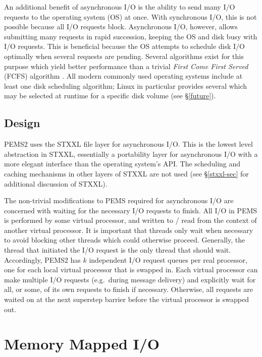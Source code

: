 \documentclass[12pt]{carletoncsthesis}
\begin{document}
An additional benefit of asynchronous I/O is the ability to send many
I/O requests to the operating system (OS) at once.  With synchronous I/O,
this is not possible because all I/O requests block.  Asynchronous I/O,
however, allows submitting many requests in rapid succession, keeping the
OS and disk busy with I/O requests.  This is beneficial because the OS
attempts to schedule disk I/O optimally when several requests are pending.
Several algorithms exist for this purpose which yield better performance than
a trivial {\em First Come First Served} (FCFS) algorithm \cite{disksched}.
All modern commonly used operating systems include at least one disk
scheduling algorithm; Linux in particular provides several which may be
selected at runtime for a specific disk volume (see \S\ref{future}).

\subsection{Design}


PEMS2 uses the STXXL \cite{stxxl} file layer for asynchronous I/O.  This is
the lowest level abstraction in STXXL, essentially a portability layer for
asynchronous I/O with a more elegant interface than the operating system's API.
The scheduling and caching mechanisms in other layers of STXXL are not used
(see \S\ref{stxxl-sec} for additional discussion of STXXL).

The non-trivial modifications to PEMS required for asynchronous I/O are
concerned with waiting for the necessary I/O requests to finish.  All I/O in
PEMS is performed by some virtual processor, and written to / read from the
context of another virtual processor.  It is important that threads only wait
when necessary to avoid blocking other threads which could otherwise proceed.
Generally, the thread that initiated the I/O request is the only thread that
should wait.  Accordingly, PEMS2 has $k$ independent I/O request queues per
real processor, one for each local virtual processor that is swapped in.
Each virtual processor can make multiple I/O requests (e.g.\ during message
delivery) and explicitly wait for all, or some, of its own requests to finish
if necessary.  Otherwise, all requests are waited on at the next superstep
barrier before the virtual processor is swapped out.

\section{Memory Mapped I/O}
\label{mmap}
\end{document}
